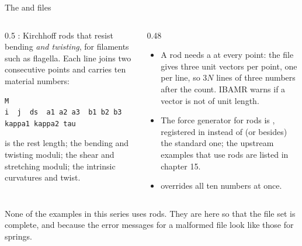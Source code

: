 \documentclass[aspectratio=169,11pt]{beamer}
\begin{document}
\begin{frame}[fragile]{The  and  files}
\begin{columns}[T,onlytextwidth]
\begin{column}{0.5\textwidth}
\small {}: Kirchhoff rods that resist bending \emph{and twisting}, for filaments such as flagella. Each line joins two consecutive points and carries ten material numbers:
\begin{lstlisting}[style=data]
M
i  j  ds  a1 a2 a3  b1 b2 b3  kappa1 kappa2 tau
\end{lstlisting}
 is the rest length;  the bending and twisting moduli;  the shear and stretching moduli;  the intrinsic curvatures and twist.
\end{column}
\begin{column}{0.48\textwidth}
\small
\begin{itemize}
  \item A rod needs a  at every point: the  file gives three unit vectors per point, one per line, so $3N$ lines of three numbers after the count. IBAMR warns if a vector is not of unit length.
  \item The force generator for rods is , registered in  instead of (or besides) the standard one; the upstream examples that use rods are listed in chapter 15.
  \item {} overrides all ten numbers at once.
\end{itemize}
\end{column}
\end{columns}
\vspace{1mm}
\begin{punchbox}
\small None of the examples in this series uses rods. They are here so that the file set is complete, and because the error messages for a malformed  file look like those for springs.
\end{punchbox}
\end{frame}
\end{document}
